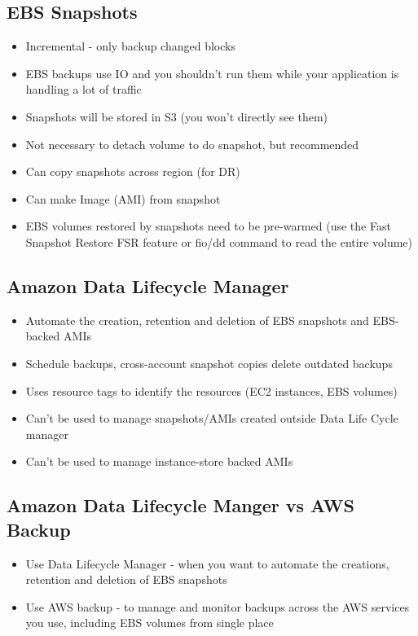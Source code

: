 \subsection{EBS Snapshots}
\begin{itemize}
    \item Incremental - only backup changed blocks
    \item EBS backups use IO and you shouldn't run them while your application is handling a lot of traffic
    \item Snapshots will be stored in S3 (you won't directly see them)
    \item Not necessary to detach volume to do snapshot, but recommended
    \item Can copy snapshots across region (for DR)
    \item Can make Image (AMI) from snapshot
    \item EBS volumes restored by snapshots need to be pre-warmed (use the Fast Snapshot Restore FSR feature or fio/dd command to read the entire volume)
\end{itemize}

\subsection{Amazon Data Lifecycle Manager}
\begin{itemize}
    \item Automate the creation, retention and deletion of EBS snapshots and EBS-backed AMIs
    \item Schedule backups, cross-account snapshot copies delete outdated backups
    \item Uses resource tags to identify the resources (EC2 instances, EBS volumes)
    \item Can't be used to manage snapshots/AMIs created outside Data Life Cycle manager
    \item Can't be used to manage instance-store backed AMIs
\end{itemize}

\subsection{Amazon Data Lifecycle Manger vs AWS Backup}
\begin{itemize}
    \item Use Data Lifecycle Manager - when you want to automate the creations, retention and deletion of EBS snapshots
    \item Use AWS backup - to manage and monitor backups across the AWS services you use, including EBS volumes from single place
\end{itemize}

